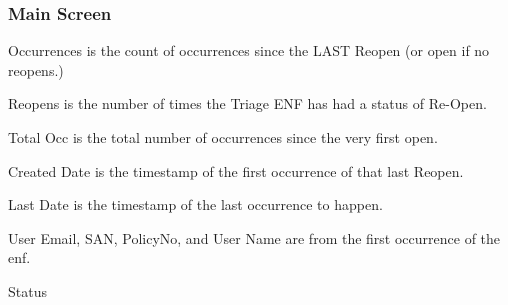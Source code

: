 \documentclass[a4paper,12pt]{report}
\begin{document}
\subsubsection*{Main Screen}
 \par
{} \par
\begin{flushleft}\item Occurrences is the count of occurrences since the LAST Reopen (or open if no reopens.)\end{flushleft} \par
\begin{flushleft}\item Reopens is the number of times the Triage ENF has had a status of Re-Open. \end{flushleft} \par
\begin{flushleft}\item Total Occ is the total number of occurrences since the very first open.\end{flushleft} \par
\begin{flushleft}\item Created Date is the timestamp of the first occurrence of that last Reopen.\end{flushleft} \par
\begin{flushleft}\item Last Date is the timestamp of the last occurrence to happen.\end{flushleft} \par
\begin{flushleft}\item User Email, SAN, PolicyNo, and User Name are from the first occurrence of the enf.\end{flushleft} \par
\begin{flushleft}\item Status\end{flushleft} \par
{} \par
\end{document}

